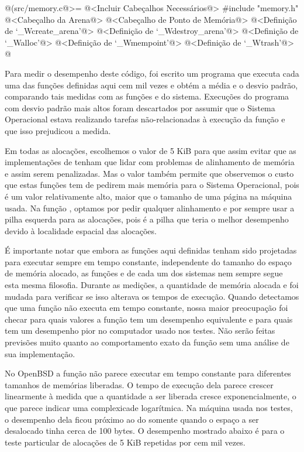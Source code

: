 \iniciocodigo
@(src/memory.c@>=
@<Incluir Cabeçalhos Necessários@>
#include "memory.h"
@<Cabeçalho da Arena@>
@<Cabeçalho de Ponto de Memória@>
@<Definição de `\_Wcreate\_arena'@>
@<Definição de `\_Wdestroy\_arena'@>
@<Definição de `\_Walloc'@>
@<Definição de `\_Wmempoint'@>
@<Definição de `\_Wtrash'@>
@
\fimcodigo


Para medir o desempenho deste código, foi escrito um programa que
executa cada uma das funções definidas aqui cem mil vezes e obtém
a média e o desvio padrão, comparando tais medidas com as
funções  e  do sistema. Execuções
do programa com desvio padrão mais altos foram descartados por assumir
que o Sistema Operacional estava realizando tarefas não-relacionadas à
execução da função e que isso prejudicou a medida.

Em todas as alocações, escolhemos o valor de 5 KiB para que assim
evitar que as implementações de  tenham que lidar
com problemas de alinhamento de memória e assim serem penalizadas. Mas
o valor também permite que observemos o custo que estas funções tem de
pedirem mais memória para o Sistema Operacional, pois é um valor
relativamente alto, maior que o tamanho de uma página na máquina
usada. Na função , optamos por pedir qualquer
alinhamento e por sempre usar a pilha esquerda para as alocações, pois
é a pilha que teria o melhor desempenho devido à localidade espacial
das alocações.

É importante notar que embora as funções aqui definidas tenham sido
projetadas para executar sempre em tempo constante, independente do
tamanho do espaço de memória alocado, as funções 
e  de cada um dos sistemas nem sempre segue esta
mesma filosofia. Durante as medições, a quantidade de memória alocada
e foi mudada para verificar se isso alterava os tempos de
execução. Quando detectamos que uma função não executa em tempo
constante, nossa maior preocupação foi checar para quais valores a
função tem um desempenho equivalente e para quais tem um desempenho
pior no computador usado nos testes. Não serão feitas previsões muito
quanto ao comportamento exato da função sem uma análise de sua
implementação.


No OpenBSD a função  não parece executar em tempo
constante para diferentes tamanhos de memórias liberadas. O tempo de
execução dela parece crescer linearmente à medida que a quantidade a
ser liberada cresce exponencialmente, o que parece indicar uma
complexicade logarítmica. Na máquina usada nos testes, o desempenho
dela ficou próximo ao do  somente quando o espaço a
ser desalocado tinha cerca de 100 bytes. O desempenho mostrado
abaixo é para o teste particular de alocações de 5 KiB repetidas por
cem mil vezes.

